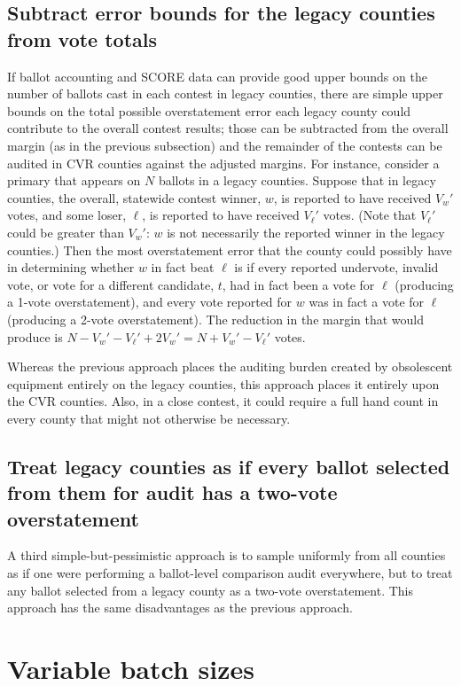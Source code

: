 \documentclass[12pt]{article}
\begin{document}
\subsection{Subtract error bounds for the legacy counties from vote totals}
If ballot accounting and SCORE data can provide good upper bounds on the number of ballots cast in
each contest in legacy counties, there are simple upper bounds on the total
possible overstatement error each legacy county could contribute to the overall contest
results; those can be subtracted from the overall margin (as in the previous subsection) and the
remainder of the contests can be audited in CVR counties against the adjusted margins.
For instance, consider a primary that appears on $N$ ballots in a legacy counties.
Suppose that in legacy counties, the overall, statewide contest winner, $w$, is reported to have received $V_w'$ votes, and some loser, $\ell$, is reported to have received $V_\ell'$ votes. 
(Note that $V_\ell'$ could be greater than $V_w'$: $w$ is not necessarily the reported winner in the legacy counties.)
Then the most overstatement error that the county could possibly have in determining whether
$w$ in fact beat $\ell$ is if every reported undervote, invalid vote, or vote for a different candidate, $t$, had 
in fact been a vote for $\ell$ (producing a 1-vote overstatement), and every vote reported for 
$w$ was in fact a vote for $\ell$ (producing a 2-vote overstatement).
The reduction in the margin that would produce is 
$N - V_w' - V_\ell' + 2V_w' = N + V_w' - V_\ell'$ votes.

Whereas the previous approach places the auditing burden created by obsolescent equipment entirely on 
the legacy counties, this approach places it entirely upon the CVR counties. Also, in a close contest, it 
could require a full hand count in every county that might not otherwise be necessary.

\subsection{Treat legacy counties as if every ballot selected from them for audit has a two-vote overstatement}\label{sec:two-vote-over}
A third simple-but-pessimistic approach is to sample uniformly from all counties as if one
were performing a ballot-level comparison audit everywhere,  but to 
treat any ballot
selected from a legacy county as a two-vote overstatement. This approach has the same disadvantages
as the previous approach.

\section{Variable batch sizes} \label{sec:variable}
\end{document}
